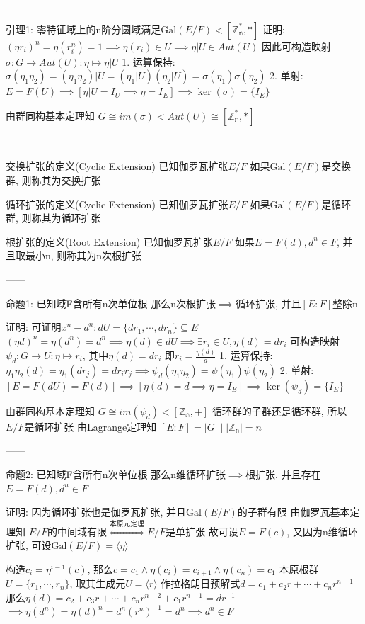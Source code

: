 ------

引理1: 零特征域上的n阶分圆域满足$\text{Gal}(E/F)<[\mathbb{Z_n^*},*]$
证明: $(\eta r_i)^n=\eta(r_i^n)=1\implies\eta(r_i)\in U\implies\eta|U\in Aut(U)$
因此可构造映射 $\sigma:G\to Aut(U):\eta\mapsto\eta|U$
1. 运算保持: $\sigma(\eta_1\eta_2)=(\eta_1\eta_2)|U=(\eta_1|U)(\eta_2|U)=\sigma(\eta_1)\sigma(\eta_2)$
2. 单射: $E=F(U)\implies[\eta|U=I_U\implies\eta=I_E]\implies\ker(\sigma)=\{I_E\}$

由群同构基本定理知 $G\cong im(\sigma)<Aut(U)\cong[\mathbb{Z_n^*},*]$

------

交换扩张的定义(Cyclic Extension)
已知伽罗瓦扩张$E/F$
如果$\text{Gal}(E/F)$是交换群, 则称其为交换扩张

循环扩张的定义(Cyclic Extension)
已知伽罗瓦扩张$E/F$
如果$\text{Gal}(E/F)$是循环群, 则称其为循环扩张

根扩张的定义(Root Extension)
已知伽罗瓦扩张$E/F$
如果$E=F(d),d^n\in F$, 并且取最小n, 则称其为n次根扩张

------

命题1: 已知域F含所有n次单位根
那么n次根扩张$\implies$循环扩张, 并且$[E:F]$整除n

证明: 可证明$x^n-d^n:dU=\{d r_1,\cdots,d r_n\}\subseteq E$
$(\eta d)^n=\eta(d^n)=d^n\implies\eta(d)\in dU\implies\exists r_i\in U,\eta(d)=d r_i$
可构造映射$\psi_d:G\to U:\eta\mapsto r_i$, 其中$\eta(d)=d r_i$ 即$r_i=\frac{\eta(d)}{d}$
1. 运算保持: $\eta_1\eta_2(d)=\eta_1(d r_j)=d r_ir_j\implies\psi_d(\eta_1\eta_2)=\psi(\eta_1)\psi(\eta_2)$
2. 单射: $[E=F(dU)=F(d)]\implies[\eta(d)=d\implies\eta=I_E]\implies\ker(\psi_d)=\{I_E\}$

由群同构基本定理知 $G\cong im(\psi_d)<[\mathbb{Z_n},+]$
循环群的子群还是循环群, 所以$E/F$是循环扩张
由Lagrange定理知 $[E:F]=|G|\mid|\mathbb{Z_n}|=n$

------

命题2: 已知域F含所有n次单位根
那么n维循环扩张$\implies$根扩张, 并且存在$E=F(d),d^n\in F$

证明: 因为循环扩张也是伽罗瓦扩张, 并且$\text{Gal}(E/F)$的子群有限
由伽罗瓦基本定理知 $E/F$的中间域有限$\overset{本原元定理}\iff E/F$是单扩张
故可设$E=F(c)$, 又因为n维循环扩张, 可设$\text{Gal}(E/F)=\langle\eta\rangle$

构造$c_i=\eta^{i-1}(c)$, 那么$c=c_1\land\eta(c_i)=c_{i+1}\land\eta(c_n)=c_1$
本原根群$U=\{r_1,\cdots,r_n\}$, 取其生成元$U=\langle r\rangle$
作拉格朗日预解式$d=c_1+c_2r+\cdots+c_nr^{n-1}$
那么$\eta(d)=c_2+c_3r+\cdots+c_nr^{n-2}+c_1r^{n-1}=dr^{-1}$
$\implies\eta(d^n)=\eta(d)^n=d^n(r^{n})^{-1}=d^n\implies d^n\in F$

